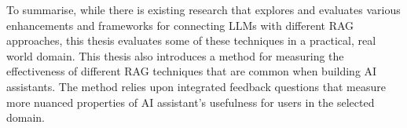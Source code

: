 

To summarise, while there is existing research that explores and evaluates various enhancements and frameworks for connecting \gls{LLM}s with different \gls{RAG} approaches, this thesis evaluates some of these techniques in a practical, real world domain. This thesis also introduces a method for measuring the effectiveness of different \gls{RAG} techniques that are common when building AI assistants. The method relies upon integrated feedback questions that measure more nuanced properties of AI assistant’s usefulness for users in the selected domain.










\cleardoublepage